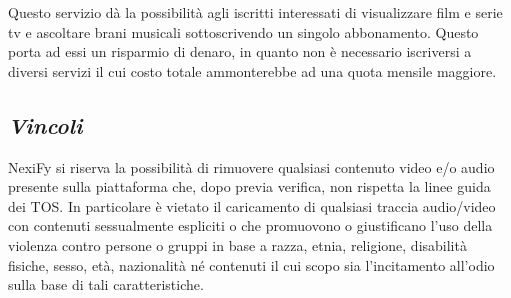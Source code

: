 Questo servizio dà la possibilità agli iscritti interessati di visualizzare film e serie tv e ascoltare brani musicali sottoscrivendo un singolo abbonamento. Questo porta ad essi un risparmio di denaro, in quanto non è necessario iscriversi a diversi servizi il cui costo totale ammonterebbe ad una quota mensile maggiore.\\

\subsection{\itshape{Vincoli}}
NexiFy si riserva la possibilità di rimuovere qualsiasi contenuto video e/o audio presente sulla piattaforma che, dopo previa verifica, non rispetta la linee guida dei TOS.
In particolare è vietato il caricamento di qualsiasi traccia audio/video con contenuti sessualmente espliciti o che promuovono o giustificano l'uso della violenza contro persone o gruppi in base a razza, etnia, religione, disabilità fisiche, sesso, età, nazionalità né contenuti il cui scopo sia l'incitamento all'odio sulla base di tali caratteristiche.
